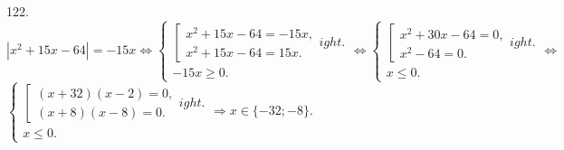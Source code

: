 122. $|x^2+15x-64|=-15x\Leftrightarrow \begin{cases}\left[\begin{array}{l} x^2+15x-64=-15x,\\ x^2+15x-64=15x.\end{array}
ight.\\ -15x\geqslant0.\end{cases}
\Leftrightarrow \begin{cases}\left[\begin{array}{l} x^2+30x-64=0,\\ x^2-64=0.\end{array}
ight.\\ x\leqslant0.\end{cases}
\Leftrightarrow$\\$ \begin{cases}\left[\begin{array}{l} (x+32)(x-2)=0,\\ (x+8)(x-8)=0.\end{array}
ight.\\ x\leqslant0.\end{cases}\Rightarrow
x\in\{-32;-8\}.$\\
